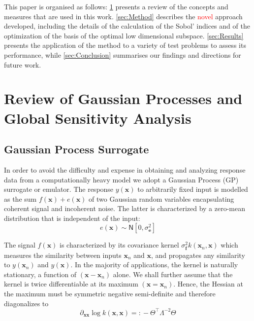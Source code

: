 \documentclass[preprint,12pt]{elsarticle}
\newcommand*{\M}[1]{\ensuremath{#1}\xspace}
\newcommand*{\vr}[1]{\M{\mathbf{#1}}}
\newcommand*{\deqr}{\M{=\mathrel{\mathop:}}}
\newcommand*{\gauss}[2]{\mathsf{N}\!\left\lbrack{} #1 , #2 \right\rbrack}
\begin{document}
        This paper is organised as follows: \cref{sec:TheoryReview} presents a review of the concepts and measures that are used in this work. \cref{sec:Method} describes the \textcolor{red}{novel} approach developed, including the details of the calculation of the Sobol' indices and of the optimization of the basis of the optimal low dimensional subspace. \cref{sec:Results} presents the application of the method to a variety of test problems to assess its performance, while \cref{sec:Conclusion} summarises our findings and directions for future work. 

    \section{Review of Gaussian Processes and Global Sensitivity Analysis} \label{sec:TheoryReview}
        \subsection{Gaussian Process Surrogate}
            In order to avoid the difficulty and expense in obtaining and analyzing response data from a computationally heavy model we adopt a Gaussian Process (GP) surrogate or emulator. The response $y(\vr{x})$ to arbitrarily fixed input is modelled as the sum $f(\vr{x})+e(\vr{x})$ of two Gaussian random variables encapsulating coherent signal and incoherent noise. The latter is characterized by a zero-mean distribution that is independent of the input:
            \begin{equation*}
                e(\vr{x}) \sim \gauss{0}{\sigma^{2}_\vr{e}}
            \end{equation*}

            The signal $f(\vr{x})$ is characterized by its covariance kernel $\sigma^{2}_\vr{f} k(\vr{x}_{n},\vr{x})$ which measures the similarity between inputs $\vr{x}_{n}$ and $\vr{x}$, and propagates any similarity to $y(\vr{x}_{n})$ and $y(\vr{x})$. In the majority of applications, the kernel is naturally stationary, a function of $(\vr{x}-\vr{x}_{n})$ alone. We shall further assume that the kernel is twice differentiable at its maximum $(\vr{x}=\vr{x}_{n})$. Hence, the Hessian at the maximum must be symmetric negative semi-definite and therefore diagonalizes to
            \begin{equation*}
                \partial_{\vr{x}\vr{x}} \log k(\vr{x},\vr{x}) \deqr -\Theta^{\intercal}\Lambda^{-2}\Theta
            \end{equation*}
\end{document}
